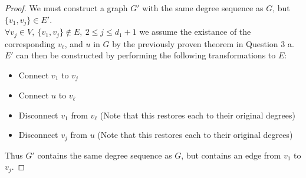 \documentclass[12pt]{article}
\newenvironment{question}[2][Question]{\begin{trivlist}
\item[\hskip \labelsep {\bfseries #1}\hskip \labelsep {\bfseries #2.}]}{\end{trivlist}}
\begin{document}
\begin{question}{3 (b)}
  \leavevmode
  \begin{proof}
    We must construct a graph $G'$ with the same degree sequence as $G$, but
    $\{v_{1}, v_{j}\} \in E'$. \\

    $\forall v_{j} \in V,\ \{v_{1}, v_{j}\} \notin E,\ 2 \leq j \leq d_{1} + 1$
    we assume the existance of the corresponding $v_{\ell}$, and $u$ in $G$ by the previously
    proven theorem in Question 3 a. \\

    $E'$ can then be constructed by performing the following transformations to $E$:
    \begin{itemize}
      \item Connect $v_{1}$ to $v_{j}$
      \item Connect $u$ to $v_{\ell}$
      \item Disconnect $v_{1}$ from $v_{\ell}$ (Note that this restores each
        to their original degrees)
      \item Disconnect $v_{j}$ from $u$ (Note that this restores each to their
        original degrees)
    \end{itemize}
    Thus $G'$ contains the same degree sequence as $G$, but contains an edge
    from $v_{1}$ to $v_{j}$.
  \end{proof}
\end{question}
\end{document}
